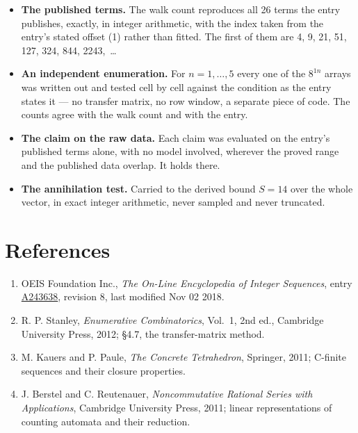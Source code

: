 \documentclass[11pt]{article}
\theoremstyle{definition}
\begin{document}
\begin{itemize}

\item {\bfseries The published terms.} The walk count reproduces all 26 terms the entry publishes, exactly, in integer arithmetic, with the index taken from the entry's stated offset (1) rather than fitted. The first of them are 4, 9, 21, 51, 127, 324, 844, 2243,~\dots

\item {\bfseries An independent enumeration.} For $n = 1,\dots,5$ every one of the $8^{1n}$ arrays was written out and tested cell by cell against the condition as the entry states it --- no transfer matrix, no row window, a separate piece of code. The counts agree with the walk count and with the entry.

\item {\bfseries The claim on the raw data.} Each claim was evaluated on the entry's published terms alone, with no model involved, wherever the proved range and the published data overlap. It holds there.

\item {\bfseries The annihilation test.} Carried to the derived bound $S = 14$ over the whole vector, in exact integer arithmetic, never sampled and never truncated.

\end{itemize}

\section{References}

\begin{enumerate}

\item OEIS Foundation Inc., \emph{The On-Line Encyclopedia of Integer Sequences}, entry \href{https://oeis.org/A243638}{A243638}, revision 8, last modified Nov 02 2018.

\item R. P. Stanley, \emph{Enumerative Combinatorics}, Vol.~1, 2nd ed., Cambridge University Press, 2012; \S4.7, the transfer-matrix method.

\item M. Kauers and P. Paule, \emph{The Concrete Tetrahedron}, Springer, 2011; C-finite sequences and their closure properties.

\item J. Berstel and C. Reutenauer, \emph{Noncommutative Rational Series with Applications}, Cambridge University Press, 2011; linear representations of counting automata and their reduction.

\end{enumerate}
\end{document}
